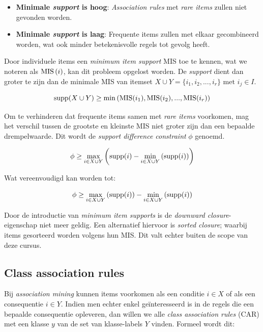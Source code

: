 \begin{itemize}
\item \textbf{Minimale \emph{support} is hoog}: \emph{Association rules} met \emph{rare items} zullen niet gevonden worden.
\item \textbf{Minimale \emph{support} is laag}: Frequente items zullen met elkaar gecombineerd worden, wat ook minder betekenisvolle regels tot gevolg heeft. 
\end{itemize}

Door individuele items een \emph{minimum item support} MIS toe te kennen, wat we noteren als $\operatorname{MIS}\left(i\right)$, kan dit probleem opgelost worden. De \emph{support} dient dan groter te zijn dan de minimale MIS van itemset $X \cup Y = \{i_1, i_2, ..., i_r\} \textrm{ met } i_j \in I$.

\begin{equation}
\operatorname{supp}(X \cup Y) \geq \min\left(\operatorname{MIS}(i_1), \operatorname{MIS}(i_2), ..., \operatorname{MIS}(i_r) \right)
\end{equation}

Om te verhinderen dat frequente items samen met \emph{rare items} voorkomen, mag het verschil tussen de grootste en kleinste MIS niet groter zijn dan een bepaalde drempelwaarde. Dit wordt de \emph{support difference constraint} $\phi$ genoemd. 

\begin{equation}
\phi \geq \max_{i\in X \cup Y}\left(\operatorname{supp}(i) - \min_{i\in X \cup Y}\left(\operatorname{supp}(i)\right)\right)
\end{equation}

Wat vereenvoudigd kan worden tot:

\begin{equation}
\phi \geq \max_{i\in X \cup Y}\left(\operatorname{supp}(i)\right) - \min_{i\in X \cup Y}\left(\operatorname{supp}(i)\right)
\end{equation}

Door de introductie van \emph{minimum item supports} is de \emph{downward closure}-eigenschap niet meer geldig\cite{Liu1999MiningSupports}. Een alternatief hiervoor is \emph{sorted closure}; waarbij items gesorteerd worden volgens hun MIS. Dit valt echter buiten de scope van deze cursus.
%
\subsection{Class association rules}
Bij \emph{association mining} kunnen items voorkomen als een conditie $i \in X$ of als een consequentie $i \in Y$. Indien men echter enkel ge\"interesseerd is in de regels die een bepaalde consequentie opleveren, dan willen we alle \emph{class association rules} (CAR) met een klasse $y$ van de set van klasse-labels $Y$ vinden. Formeel wordt dit:


